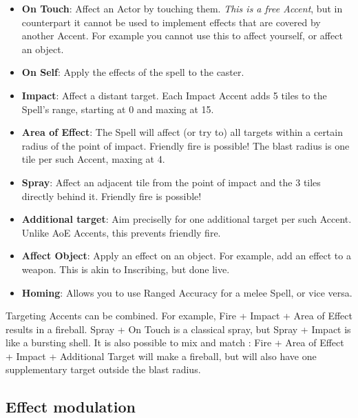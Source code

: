 \begin{itemize}
    \item \textbf{On Touch}: Affect an Actor by touching them. \textit{This is a free Accent}, but in counterpart it cannot be used to implement effects that are covered by another Accent. For example you cannot use this to affect yourself, or affect an object.
    \item \textbf{On Self}: Apply the effects of the spell to the caster.
    \item \textbf{Impact}: Affect a distant target. Each Impact Accent adds 5 tiles to the Spell's range, starting at 0 and maxing at 15. 
    \item \textbf{Area of Effect}: The Spell will affect (or try to) all targets within a certain radius of the point of impact. Friendly fire is possible! The blast radius is one tile per such Accent, maxing at 4.
    \item \textbf{Spray}: Affect an adjacent tile from the point of impact and the 3 tiles directly behind it. Friendly fire is possible!
    \item \textbf{Additional target}: Aim preciselly for one additional target per such Accent. Unlike AoE Accents, this prevents friendly fire.
    \item \textbf{Affect Object}: Apply an effect on an object. For example, add an effect to a weapon. This is akin to Inscribing, but done live.
    \item \textbf{Homing}: Allows you to use Ranged Accuracy for a melee Spell, or vice versa.
\end{itemize}

Targeting Accents can be combined. For example, Fire + Impact + Area of Effect results in a fireball. Spray + On Touch is a classical spray, but Spray + Impact is like a bursting shell. It is also possible to mix and match : Fire + Area of Effect + Impact + Additional Target will make a fireball, but will also have one supplementary target outside the blast radius.

\subsection{Effect modulation}

